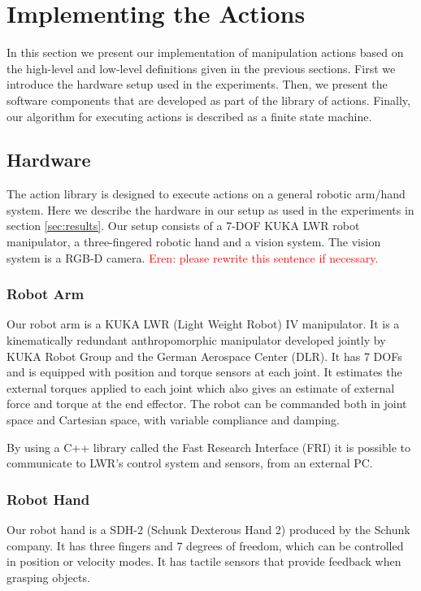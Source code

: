 \section{Implementing the Actions}
\label{sec:Implementing}

In this section we present our implementation of manipulation actions based on the high-level and low-level definitions given in the previous sections.
First we introduce the hardware setup used in the experiments.
Then, we present the software components that are developed as part of the library of actions.
Finally, our algorithm for executing actions is described as a finite state machine.



\subsection{Hardware}
\label{sec:hardware}
The action library is designed to execute actions on a general robotic arm/hand system.
Here we describe the hardware in our setup as used in the experiments in section \ref{sec:results}.
Our setup consists of a 7-DOF KUKA LWR robot manipulator, a three-fingered robotic hand and a vision system. 
The vision system is a RGB-D camera. \textcolor{red}{Eren: please rewrite this sentence if necessary.}

\subsubsection{Robot Arm}
Our robot arm is a KUKA LWR (Light Weight Robot) IV manipulator.
It is a kinematically redundant anthropomorphic manipulator developed jointly by KUKA Robot Group and the German Aerospace Center (DLR).
It has 7 DOFs and is equipped with position and torque sensors at each joint.
It estimates the external torques applied to each joint which also gives an estimate of external force and torque at the end effector.
The robot can be commanded both in joint space and Cartesian space, with variable compliance and damping.

By using a C++ library called the Fast Research Interface (FRI) it is possible to communicate to LWR's control system and sensors, from an external PC.

\subsubsection{Robot Hand}
Our robot hand is a SDH-2 (Schunk Dexterous Hand 2) produced by the Schunk company.
It has three fingers and 7 degrees of freedom, which can be controlled in position or velocity modes.
It has tactile sensors that provide feedback when grasping objects.

